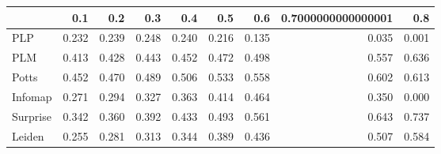 \begin{tabular}{lrrrrrrrr}
\toprule
{} &   0.1 &   0.2 &   0.3 &   0.4 &   0.5 &   0.6 & 0.7000000000000001 &   0.8 \\
\midrule
PLP      & 0.232 & 0.239 & 0.248 & 0.240 & 0.216 & 0.135 &              0.035 & 0.001 \\
PLM      & 0.413 & 0.428 & 0.443 & 0.452 & 0.472 & 0.498 &              0.557 & 0.636 \\
Potts    & 0.452 & 0.470 & 0.489 & 0.506 & 0.533 & 0.558 &              0.602 & 0.613 \\
Infomap  & 0.271 & 0.294 & 0.327 & 0.363 & 0.414 & 0.464 &              0.350 & 0.000 \\
Surprise & 0.342 & 0.360 & 0.392 & 0.433 & 0.493 & 0.561 &              0.643 & 0.737 \\
Leiden   & 0.255 & 0.281 & 0.313 & 0.344 & 0.389 & 0.436 &              0.507 & 0.584 \\
\bottomrule
\end{tabular}
